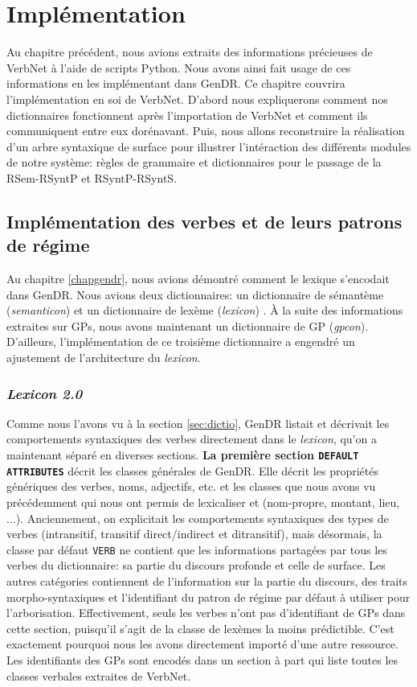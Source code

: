 
\chapter{Implémentation}\label{ch:implementation}

Au chapitre précédent, nous avions extraits des informations précieuses de VerbNet à l'aide de scripts Python. Nous avons ainsi fait usage de ces informations en les implémentant dans GenDR. Ce chapitre couvrira l'implémentation en soi de VerbNet. D'abord nous expliquerons comment nos dictionnaires fonctionnent après l'importation de VerbNet et comment ils communiquent entre eux dorénavant. Puis, nous allons reconstruire la réalisation d'un arbre syntaxique de surface pour illustrer l'intéraction des différents modules de notre système: règles de grammaire et dictionnaires pour le passage de la \ac{RSem}-\ac{RSyntP} et \ac{RSyntP}-\ac{RSyntS}.

\section{Implémentation des verbes et de leurs patrons de régime}

Au chapitre \ref{chapgendr}, nous avions démontré comment le lexique s'encodait dans GenDR. Nous avions deux dictionnaires: un dictionnaire de sémantème (\emph{semanticon}) et un dictionnaire de lexème (\emph{lexicon}) . À la suite des informations extraites sur \acp{GP}, nous avons maintenant un dictionnaire de \ac{GP} (\emph{gpcon}). D'ailleurs, l'implémentation de ce troisième dictionnaire a engendré un ajustement de l'architecture du \emph{lexicon}.

\subsection{\emph{Lexicon 2.0}}
Comme nous l'avons vu à la section \ref{sec:dictio}, GenDR listait et décrivait les comportements syntaxiques des verbes directement dans le \emph{lexicon}, qu'on a maintenant séparé en diverses sections. \textbf{La première section \texttt{DEFAULT ATTRIBUTES}} décrit les classes générales de GenDR. Elle décrit les propriétés génériques des verbes, noms,  adjectifs, etc. et les classes que nous avons vu précédemment qui nous ont permis de lexicaliser  et  (nom-propre, montant, lieu, ...). Anciennement, on explicitait les comportements syntaxiques des types de verbes (intransitif, transitif direct/indirect et ditransitif), mais désormais, la classe par défaut \texttt{VERB} ne contient que les informations partagées par tous les verbes du dictionnaire: sa partie du discours profonde et celle de surface. Les autres catégories contiennent de l'information sur la partie du discours, des traits morpho-syntaxiques et l'identifiant du patron de régime par défaut à utiliser pour l'arborisation. Effectivement, seuls les verbes n'ont pas d'identifiant de \acp{GP} dans cette section, puisqu'il s'agit de la classe de lexèmes la moins prédictible. C'est exactement pourquoi nous les avons directement importé d'une autre ressource. Les identifiants des \acp{GP} sont encodés dans un section à part qui liste toutes les classes verbales extraites de VerbNet.

